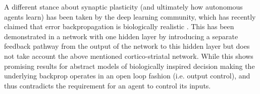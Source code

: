 \documentclass{article}
\begin{document}
A different stance about synaptic plasticity (and ultimately how
autonomous agents learn) has been taken by the deep learning
community, which has recently claimed that error backpropagation is
biologically realistic \cite{Lillicrap2016,Roelfsema2018}. This has
been demonstrated in a network with one hidden layer by introducing a
separate feedback pathway from the output of the network to this
hidden layer but does not take account the above mentioned
cortico-striatal network. While this shows promising results for
abstract models of biologically inspired decision making the underlying
backprop operates in an open loop fashion (i.e. output control), and thus
contradicts the requirement for an agent to control its inputs.




\end{document}
